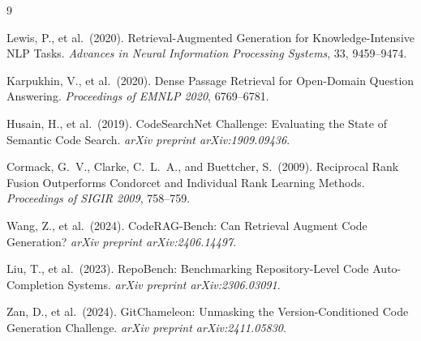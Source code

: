 \documentclass[a4paper,12pt]{article}
\begin{document}
\newpage
\begin{thebibliography}{9}

Lewis, P., et al.\ (2020).
Retrieval-Augmented Generation for Knowledge-Intensive NLP Tasks.
\textit{Advances in Neural Information Processing Systems}, 33, 9459--9474.

Karpukhin, V., et al.\ (2020).
Dense Passage Retrieval for Open-Domain Question Answering.
\textit{Proceedings of EMNLP 2020}, 6769--6781.

Husain, H., et al.\ (2019).
CodeSearchNet Challenge: Evaluating the State of Semantic Code Search.
\textit{arXiv preprint arXiv:1909.09436}.

Cormack, G.~V., Clarke, C.~L.~A., and Buettcher, S.\ (2009).
Reciprocal Rank Fusion Outperforms Condorcet and Individual Rank Learning Methods.
\textit{Proceedings of SIGIR 2009}, 758--759.

Wang, Z., et al.\ (2024).
CodeRAG-Bench: Can Retrieval Augment Code Generation?
\textit{arXiv preprint arXiv:2406.14497}.

Liu, T., et al.\ (2023).
RepoBench: Benchmarking Repository-Level Code Auto-Completion Systems.
\textit{arXiv preprint arXiv:2306.03091}.

Zan, D., et al.\ (2024).
GitChameleon: Unmasking the Version-Conditioned Code Generation Challenge.
\textit{arXiv preprint arXiv:2411.05830}.

\end{thebibliography}
\end{document}
